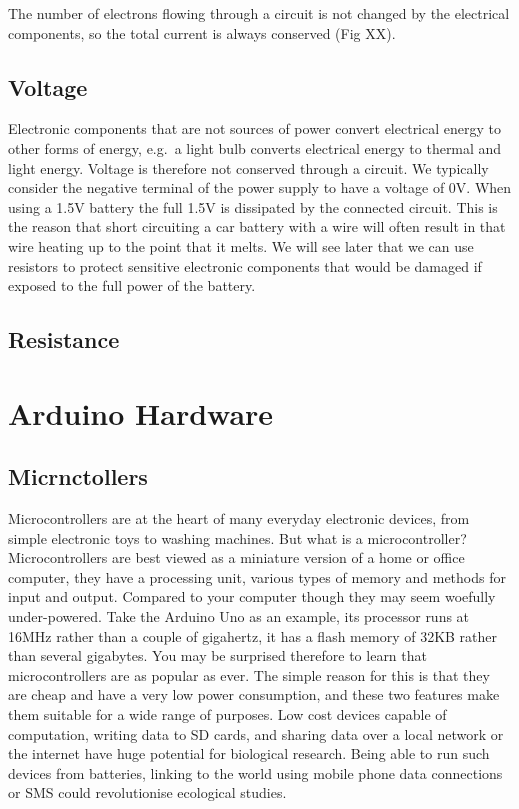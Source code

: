 \documentclass[
]{book}
\begin{document}
The number of electrons flowing through a circuit is not changed by the electrical components, so the total current is always conserved (Fig XX).

\section{Voltage}\label{voltage}

Electronic components that are not sources of power convert electrical energy to other forms of energy, e.g.~a light bulb converts electrical energy to thermal and light energy. Voltage is therefore not conserved through a circuit. We typically consider the negative terminal of the power supply to have a voltage of 0V. When using a 1.5V battery the full 1.5V is dissipated by the connected circuit. This is the reason that short circuiting a car battery with a wire will often result in that wire heating up to the point that it melts. We will see later that we can use resistors to protect sensitive electronic components that would be damaged if exposed to the full power of the battery.

\section{Resistance}\label{resistance}

\chapter{Arduino Hardware}\label{arduino-hardware}

\section{Micrnctollers}\label{micrnctollers}

Microcontrollers are at the heart of many everyday electronic devices, from simple electronic toys to washing machines. But what is a microcontroller? Microcontrollers are best viewed as a miniature version of a home or office computer, they have a processing unit, various types of memory and methods for input and output. Compared to your computer though they may seem woefully under-powered. Take the Arduino Uno as an example, its processor runs at 16MHz rather than a couple of gigahertz, it has a flash memory of 32KB rather than several gigabytes. You may be surprised therefore to learn that microcontrollers are as popular as ever. The simple reason for this is that they are cheap and have a very low power consumption, and these two features make them suitable for a wide range of purposes. Low cost devices capable of computation, writing data to SD cards, and sharing data over a local network or the internet have huge potential for biological research. Being able to run such devices from batteries, linking to the world using mobile phone data connections or SMS could revolutionise ecological studies.
\end{document}
